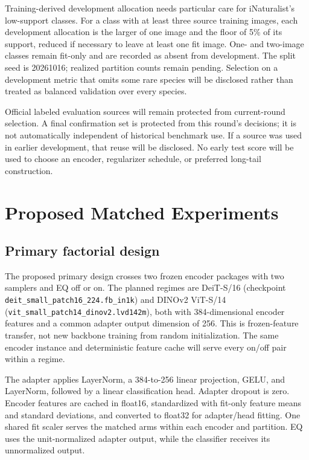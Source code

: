 \documentclass[conference]{IEEEtran}
\begin{document}
Training-derived development allocation needs particular care for iNaturalist's low-support classes. For a class with at least three source training images, each development allocation is the larger of one image and the floor of 5\% of its support, reduced if necessary to leave at least one fit image. One- and two-image classes remain fit-only and are recorded as absent from development. The split seed is 20261016; realized partition counts remain pending. Selection on a development metric that omits some rare species will be disclosed rather than treated as balanced validation over every species.

Official labeled evaluation sources will remain protected from current-round selection. A final confirmation set is protected from this round's decisions; it is not automatically independent of historical benchmark use. If a source was used in earlier development, that reuse will be disclosed. No early test score will be used to choose an encoder, regularizer schedule, or preferred long-tail construction.

\section{Proposed Matched Experiments}
\subsection{Primary factorial design}
The proposed primary design crosses two frozen encoder packages with two samplers and EQ off or on. The planned regimes are DeiT-S/16 (checkpoint \nolinkurl{deit_small_patch16_224.fb_in1k}) and DINOv2 ViT-S/14 (\nolinkurl{vit_small_patch14_dinov2.lvd142m}), both with 384-dimensional encoder features and a common adapter output dimension of 256. This is frozen-feature transfer, not new backbone training from random initialization. The same encoder instance and deterministic feature cache will serve every on/off pair within a regime.

The adapter applies LayerNorm, a 384-to-256 linear projection, GELU, and LayerNorm, followed by a linear classification head. Adapter dropout is zero. Encoder features are cached in float16, standardized with fit-only feature means and standard deviations, and converted to float32 for adapter/head fitting. One shared fit scaler serves the matched arms within each encoder and partition. EQ uses the unit-normalized adapter output, while the classifier receives its unnormalized output.
\end{document}
